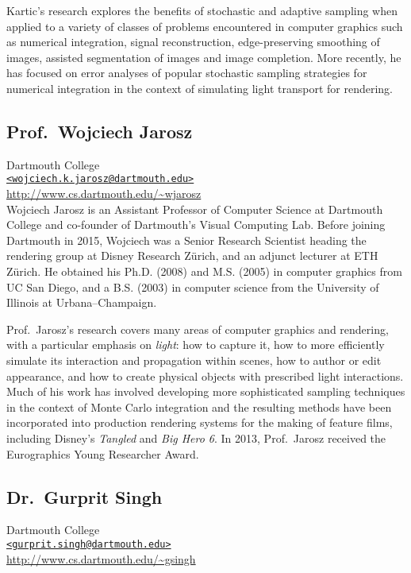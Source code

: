 \documentclass[11pt,fleqn]{book} %
\begin{document}
Kartic's research explores the benefits of stochastic and adaptive sampling when applied to a variety of classes of problems encountered in computer graphics such as numerical integration, signal reconstruction, edge-preserving smoothing of images, assisted segmentation of images and image completion. More recently, he has focused on error analyses of popular stochastic sampling strategies for numerical integration in the context of simulating light transport for rendering.

\bigskip

\subsection*{Prof.\ Wojciech Jarosz}
Dartmouth College\\
\href{mailto:wojciech.k.jarosz@dartmouth.edu}{\texttt{<wojciech.k.jarosz@dartmouth.edu>}}\\
\url{http://www.cs.dartmouth.edu/~wjarosz}\\

Wojciech Jarosz is an Assistant Professor of Computer Science at Dartmouth College and co-founder of Dartmouth's Visual Computing Lab. Before joining Dartmouth in 2015, Wojciech was a Senior Research Scientist heading the rendering group at Disney Research Zürich, and an adjunct lecturer at ETH Zürich. He obtained his Ph.D. (2008) and M.S. (2005) in computer graphics from UC San Diego, and a B.S. (2003) in computer science from the University of Illinois at Urbana–Champaign.

Prof.\ Jarosz’s research covers many areas of computer graphics and rendering, with a particular emphasis on \emph{light}: how to capture it, how to more efficiently simulate its interaction and propagation within scenes, how to author or edit appearance, and how to create physical objects with prescribed light interactions. Much of his work has involved developing more sophisticated sampling techniques in the context of Monte Carlo integration and the resulting methods have been incorporated into production rendering systems for the making of feature films, including Disney's \textit{Tangled} and \textit{Big Hero 6}. In 2013, Prof.\ Jarosz received the Eurographics Young Researcher Award.

\bigskip

\subsection*{Dr.\ Gurprit Singh}
Dartmouth College\\
\href{mailto:gurprit.singh@dartmouth.edu}{\texttt{<gurprit.singh@dartmouth.edu>}}\\
\url{http://www.cs.dartmouth.edu/~gsingh}\\
\end{document}
